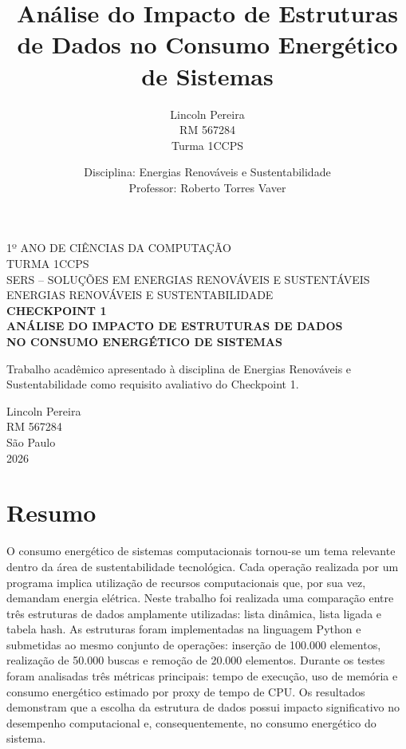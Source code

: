 \documentclass[12pt,a4paper]{article}
\title{Análise do Impacto de Estruturas de Dados no Consumo Energético de Sistemas}
\author{Lincoln Pereira \\ RM 567284 \\ Turma 1CCPS}
\date{Disciplina: Energias Renováveis e Sustentabilidade \\ Professor: Roberto Torres Vaver}
\begin{document}
\begin{titlepage}
\begin{center}

{\normalsize 1º ANO DE CIÊNCIAS DA COMPUTAÇÃO}\\
{\normalsize TURMA 1CCPS}\\[2cm]

{\normalsize SERS – SOLUÇÕES EM ENERGIAS RENOVÁVEIS E SUSTENTÁVEIS}\\
{\normalsize ENERGIAS RENOVÁVEIS E SUSTENTABILIDADE}\\[2.5cm]

{\Large \textbf{CHECKPOINT 1}}\\[0.5cm]

{\Large \textbf{ANÁLISE DO IMPACTO DE ESTRUTURAS DE DADOS}}\\
{\Large \textbf{NO CONSUMO ENERGÉTICO DE SISTEMAS}}\\[3cm]

\begin{flushright}
\begin{minipage}{0.45\textwidth}
Trabalho acadêmico apresentado à disciplina de Energias Renováveis e Sustentabilidade como requisito avaliativo do Checkpoint 1.
\end{minipage}
\end{flushright}

\vfill

Lincoln Pereira\\
RM 567284\\[1cm]

São Paulo\\
2026

\end{center}
\end{titlepage}

\section*{Resumo}

O consumo energético de sistemas computacionais tornou-se um tema relevante dentro da área de sustentabilidade tecnológica. Cada operação realizada por um programa implica utilização de recursos computacionais que, por sua vez, demandam energia elétrica. Neste trabalho foi realizada uma comparação entre três estruturas de dados amplamente utilizadas: lista dinâmica, lista ligada e tabela hash. As estruturas foram implementadas na linguagem Python e submetidas ao mesmo conjunto de operações: inserção de 100.000 elementos, realização de 50.000 buscas e remoção de 20.000 elementos. Durante os testes foram analisadas três métricas principais: tempo de execução, uso de memória e consumo energético estimado por proxy de tempo de CPU. Os resultados demonstram que a escolha da estrutura de dados possui impacto significativo no desempenho computacional e, consequentemente, no consumo energético do sistema.
\end{document}
